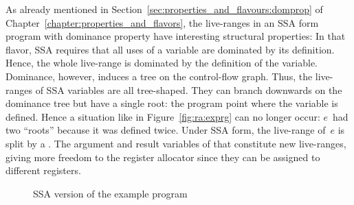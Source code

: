 {As already mentioned in Section~\ref{sec:properties_and_flavours:domprop} of Chapter~\ref{chapter:properties_and_flavors}, the live-ranges in an SSA form program with dominance property have interesting structural properties:
In that flavor, SSA requires that all uses of a variable are dominated by its definition.
Hence, the whole live-range is dominated by the definition of the variable.
Dominance, however, induces a tree on the control-flow graph.
Thus, the live-ranges of SSA variables are all tree-shaped.
They can branch downwards on the dominance tree but have a single root:
the program point where the variable is defined.
Hence a situation like in Figure~\ref{fig:ra:exprg} can no longer occur:
$e$~had two ``roots'' because it was defined twice.
Under SSA form, the live-range of~$e$ is split by a \phifun.
The argument and result variables of that \phifun constitute new live-ranges, giving more freedom to the register allocator since they can be assigned to different registers.

\begin{figure}[htbp]
	\begin{center}
		\qquad
	\end{center}
	\caption{SSA version of the example program}
	\label{fig:ra:exprgssa}
\end{figure}

}
